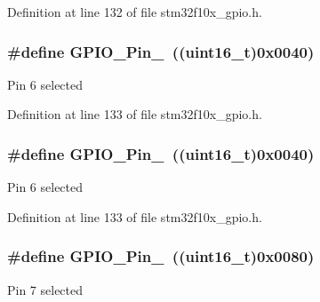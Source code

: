 Definition at line 132 of file stm32f10x\+\_\+gpio.\+h.

\subsubsection[{\texorpdfstring{G\+P\+I\+O\+\_\+\+Pin\+\_\+6}{GPIO_Pin_6}}]{\setlength{\rightskip}{0pt plus 5cm}\#define G\+P\+I\+O\+\_\+\+Pin\+\_~(({\bf uint16\+\_\+t})0x0040)}\hypertarget{group___g_p_i_o__pins__define_gaf047899d873f27c2db9f50b342e35a58}{}\label{group___g_p_i_o__pins__define_gaf047899d873f27c2db9f50b342e35a58}
Pin 6 selected 

Definition at line 133 of file stm32f10x\+\_\+gpio.\+h.

\subsubsection[{\texorpdfstring{G\+P\+I\+O\+\_\+\+Pin\+\_\+6}{GPIO_Pin_6}}]{\setlength{\rightskip}{0pt plus 5cm}\#define G\+P\+I\+O\+\_\+\+Pin\+\_~(({\bf uint16\+\_\+t})0x0040)}\hypertarget{group___g_p_i_o__pins__define_gaf047899d873f27c2db9f50b342e35a58}{}\label{group___g_p_i_o__pins__define_gaf047899d873f27c2db9f50b342e35a58}
Pin 6 selected 

Definition at line 133 of file stm32f10x\+\_\+gpio.\+h.

\subsubsection[{\texorpdfstring{G\+P\+I\+O\+\_\+\+Pin\+\_\+7}{GPIO_Pin_7}}]{\setlength{\rightskip}{0pt plus 5cm}\#define G\+P\+I\+O\+\_\+\+Pin\+\_~(({\bf uint16\+\_\+t})0x0080)}\hypertarget{group___g_p_i_o__pins__define_ga7346b6ce5507bd28a7a79e7dcc816c08}{}\label{group___g_p_i_o__pins__define_ga7346b6ce5507bd28a7a79e7dcc816c08}
Pin 7 selected 


